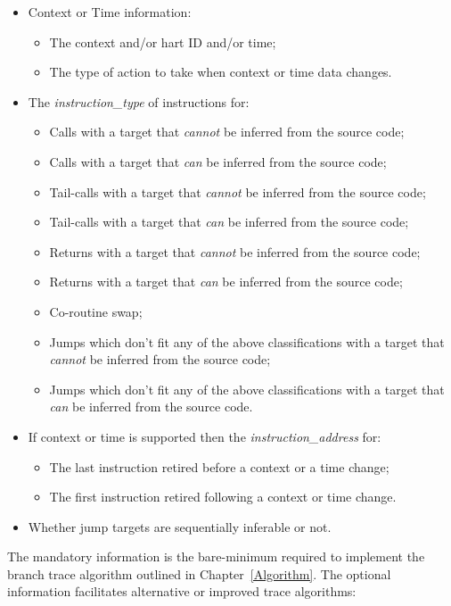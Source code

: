 \begin{itemize}
  \item Context or Time information:
    \begin{itemize}
      \item The context and/or hart ID and/or time;
      \item The type of action to take when context or time data changes.
    \end{itemize}
  \item The \textit{instruction\_type} of instructions for:
    \begin{itemize}
      \item Calls with a target that \textit{cannot} be inferred from the source code;
      \item Calls with a target that \textit{can} be inferred from the source code;
      \item Tail-calls with a target that \textit{cannot} be inferred from the source code;
      \item Tail-calls with a target that \textit{can} be inferred from the source code;
      \item Returns with a target that \textit{cannot} be inferred from the source code;
      \item Returns with a target that \textit{can} be inferred from the source code;
      \item Co-routine swap;
      \item Jumps which don't fit any of the above classifications with a target that \textit{cannot} be inferred from the source code;
      \item Jumps which don't fit any of the above classifications with a target that \textit{can} be inferred from the source code.
    \end{itemize}
  \item If context or time is supported then the \textit{instruction\_address} for:
    \begin{itemize}
      \item The last instruction retired before a context or a time change;
      \item The first instruction retired following a context or time change.
    \end{itemize}
  \item Whether jump targets are sequentially inferable or not.
\end{itemize}

The mandatory information is the bare-minimum required to implement the branch trace algorithm outlined in Chapter~\ref{Algorithm}.  
The optional information facilitates alternative or improved trace algorithms:

